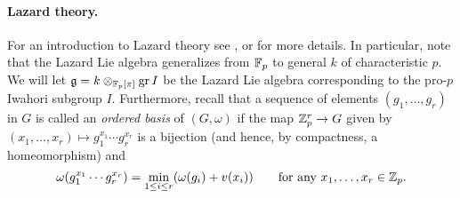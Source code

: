 \paragraph{Lazard theory.} For an introduction to Lazard theory see , or \cite{Sch} for more details. In particular, note that the Lazard Lie algebra generalizes from $\mathbb{F}_{p}$ to general $k$ of characteristic $p$. We will let $\mathfrak{g} = k \otimes_{\mathbb{F}_p[\pi]} \operatorname{gr} I$ be the Lazard Lie algebra corresponding to the pro-$p$ Iwahori subgroup $I$. Furthermore, recall that a sequence of elements $(g_1,\dotsc,g_r)$ in $G$ is called an \emph{ordered basis} of $(G,\omega)$ if the map $\mathbb{Z}_{p}^{r} \to G$ given by $(x_{1},\dotsc,x_{r}) \mapsto g_{1}^{x_{1}} \dotsb g_{r}^{x_{r}}$ is a bijection (and hence, by compactness, a homeomorphism) and
\begin{equation*}
  \omega(g_1^{x_1}\dotsb g_r^{x_r}) = \min_{1 \leq i \leq r}(\omega(g_i)+v(x_i)) \qquad \text{for any } x_1,\dotsc,x_r\in\mathbb{Z}_p.
\end{equation*}

